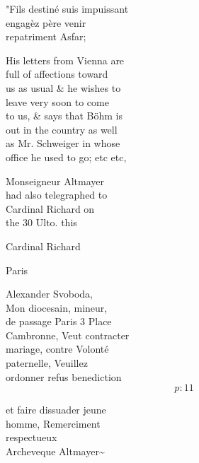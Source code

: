 \documentclass{report}
\begin{document}
	\par{
 	"Fils destiné suis impuissant\ \\engagèz père venir\ \\repatriment Asfar;\ \\
	}

	\par{
 	His letters from Vienna are\ \\full of affections toward\ \\us as usual \& he wishes to\ \\leave very soon to come\ \\to us, \& says that Böhm is\ \\out in the country as well\ \\as Mr. Schweiger in whose\ \\office he used to go; etc etc,\ \\
	}

	\par{
 	Monseigneur Altmayer\ \\had also telegraphed to\ \\Cardinal Richard on\ \\the 30 Ulto. this\ \\
	}

	\par{
 	Cardinal Richard\ \\
	}

	\par{
 	Paris\ \\
	}

	\par{
 	Alexander Svoboda,\ \\Mon diocesain, mineur,\ \\de passage Paris 3 Place\ \\Cambronne, Veut contracter\ \\mariage, contre Volonté\ \\paternelle, Veuillez\ \\ordonner refus benediction\ \\
  \[p: 11 \]

	}


	\par{
 	et faire dissuader jeune\ \\homme, Remerciment\ \\respectueux\ \\Archeveque Altmayer\~{}\ \\
	}
\end{document}
